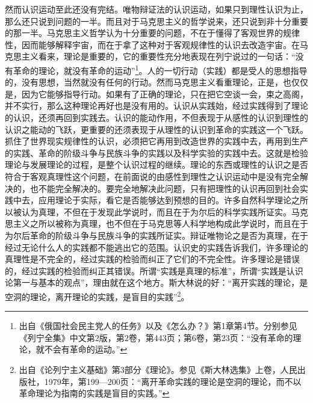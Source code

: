 \documentclass[UTF8, 12pt, a4paper]{ctexrep}
\begin{document}
然而认识运动至此还没有完结。唯物辩证法的认识运动，如果只到理性认识为止，那么还只说到问题的一半。而且对于马克思主义的哲学说来，还只说到非十分重要的那一半。马克思主义哲学认为十分重要的问题，不在于懂得了客观世界的规律性，因而能够解释宇宙，而在于拿了这种对于客观规律性的认识去改造宇宙。在马克思主义看来，理论是重要的，它的重要性充分地表现在列宁说过的一句话：“没有革命的理论，就没有革命的运动”\footnote{出自《俄国社会民主党人的任务》以及《怎么办？》第1章第4节。分别参见《列宁全集》中文第2版，第2卷，第443页；第6卷，第23页：“没有革命的理论，就不会有革命的运动。”}。人的一切行动（实践）都是受人的思想指导的，没有思想，当然就没有任何的行动。然而马克思主义看重理论，正是，也仅仅是，因为它能够指导行动。如果有了正确的理论，只在把它空谈一会，束之高阁，并不实行，那么这种理论再好也是没有用的。认识从实践始，经过实践得到了理论的认识，还须再回到实践去。认识的能动作用，不但表现于从感性的认识到理性的认识之能动的飞跃，更重要的还须表现于从理性的认识到革命的实践这一个飞跃。抓住了世界现实规律性的认识，必须把它再用到改造世界的实践中去，再用到生产的实践、革命的阶级斗争与民族斗争的实践以及科学实验的实践中去。这就是检验理论与发展理论的过程，是整个认识过程的继续。理论的东西或理性的认识之是否符合于客观真理性这个问题，在前面说的由感性到理性之认识运动中是没有完全解决的，也不能完全解决的。要完全地解决此问题，只有把理性的认识再回到社会实践中去，应用理论于实际，看它是否能够达到预想的目的。许多自然科学理论之所以被认为真理，不但在于发现此学说时，而且在于为尔后的科学实践所证实。马克思主义之所以被称为真理，也不但在于马克思等人科学地构成此学说时，而且在于为尔后革命的阶级斗争与民族斗争的实践所证实。辩证唯物论之是否为真理，在于经过无论什么人的实践都不能逃出它的范围。认识史的实践告诉我们，许多理论的真理性是不完全的，经过实践的检验而纠正了它们的不完全性。许多理论是错误的，经过实践的检验而纠正其错误。所谓“实践是真理的标准”，所谓“实践是认识论第一与基本的观点”，理由就在这个地方。斯大林说的好：“离开实践的理论，是空洞的理论，离开理论的实践，是盲目的实践”\footnote{出自《论列宁主义基础》第3部分《理论》。参见《斯大林选集》上卷，人民出版社，1979年，第199—200页：“离开革命实践的理论是空洞的理论，而不以革命理论为指南的实践是盲目的实践。”}。
\end{document}
